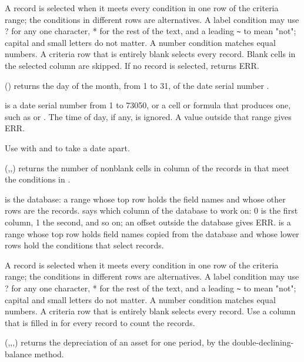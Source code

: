 A record is selected when it meets every condition in one row of the criteria range; the conditions in different rows are alternatives. A label condition may use ? for any one character, * for the rest of the text, and a leading \texttt{\textasciitilde} to mean "not"; capital and small letters do not matter. A number condition matches equal numbers. A criteria row that is entirely blank selects every record. Blank cells in the selected column are skipped. If no record is selected,  returns ERR.

\Examples
{}

() returns the day of the month, from 1 to 31, of the date serial number .

 is a date serial number from 1 to 73050, or a cell or formula that produces one, such as  or . The time of day, if any, is ignored. A value outside that range gives ERR.

Use  with  and  to take a date apart.

\Examples
{}

(,,) returns the number of nonblank cells in column  of the records in  that meet the conditions in .

 is the database: a range whose top row holds the field names and whose other rows are the records.  says which column of the database to work on: 0 is the first column, 1 the second, and so on; an offset outside the database gives ERR.  is a range whose top row holds field names copied from the database and whose lower rows hold the conditions that select records.

A record is selected when it meets every condition in one row of the criteria range; the conditions in different rows are alternatives. A label condition may use ? for any one character, * for the rest of the text, and a leading \texttt{\textasciitilde} to mean "not"; capital and small letters do not matter. A number condition matches equal numbers. A criteria row that is entirely blank selects every record. Use a column that is filled in for every record to count the records.

\Examples
{}

(,,,) returns the depreciation of an asset for one period, by the double-declining-balance method.

